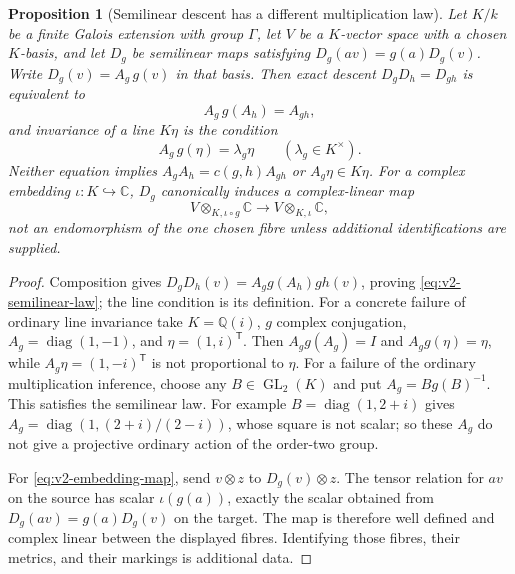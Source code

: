 \documentclass[11pt]{article}
\newtheorem{proposition}[proposition]{Proposition}
\theoremstyle{definition}
\theoremstyle{remark}
\newcommand{\C}{\mathbb C}
\newcommand{\Q}{\mathbb Q}
\begin{document}
\begin{proposition}[Semilinear descent has a different multiplication law]
\label{prop:v2-semilinear}
Let $K/k$ be a finite Galois extension with group $\Gamma$, let $V$ be a
$K$-vector space with a chosen $K$-basis, and let $D_g$ be semilinear maps
satisfying $D_g(av)=g(a)D_g(v)$. Write $D_g(v)=A_g\,g(v)$ in that basis.
Then exact descent $D_gD_h=D_{gh}$ is equivalent to
\begin{equation}
 A_g\,g(A_h)=A_{gh},
 \label{eq:v2-semilinear-law}
\end{equation}
and invariance of a line $K\eta$ is the condition
\begin{equation}
 A_g\,g(\eta)=\lambda_g\eta\qquad(\lambda_g\in K^\times).
 \label{eq:v2-semilinear-ray}
\end{equation}
Neither equation implies $A_gA_h=c(g,h)A_{gh}$ or $A_g\eta\in K\eta$.
For a complex embedding $\iota:K\hookrightarrow\C$, $D_g$ canonically
induces a complex-linear map
\begin{equation}
 V\otimes_{K,\iota\circ g}\C\longrightarrow
 V\otimes_{K,\iota}\C,
 \label{eq:v2-embedding-map}
\end{equation}
not an endomorphism of the one chosen fibre unless additional
identifications are supplied.
\end{proposition}
\begin{proof}
Composition gives
$D_gD_h(v)=A_g g(A_h)gh(v)$, proving
\eqref{eq:v2-semilinear-law}; the line condition is its definition.
For a concrete failure of ordinary line invariance take $K=\Q(i)$,
$g$ complex conjugation, $A_g=\operatorname{diag}(1,-1)$, and
$\eta=(1,i)^{\mathsf T}$. Then $A_g g(A_g)=I$ and
$A_g g(\eta)=\eta$, while $A_g\eta=(1,-i)^{\mathsf T}$ is not proportional
to $\eta$. For a failure of the ordinary multiplication inference, choose
any $B\in\operatorname{GL}_2(K)$ and put
$A_g=B g(B)^{-1}$. This satisfies the semilinear law. For example
$B=\operatorname{diag}(1,2+i)$ gives
$A_g=\operatorname{diag}(1,(2+i)/(2-i))$, whose square is not scalar;
so these $A_g$ do not give a projective ordinary action of the order-two
group.

For \eqref{eq:v2-embedding-map}, send $v\otimes z$ to $D_g(v)\otimes z$.
The tensor relation for $av$ on the source has scalar $\iota(g(a))$,
exactly the scalar obtained from $D_g(av)=g(a)D_g(v)$ on the target. The
map is therefore well defined and complex linear between the displayed
fibres. Identifying those fibres, their metrics, and their markings is
additional data.
\end{proof}
\end{document}
